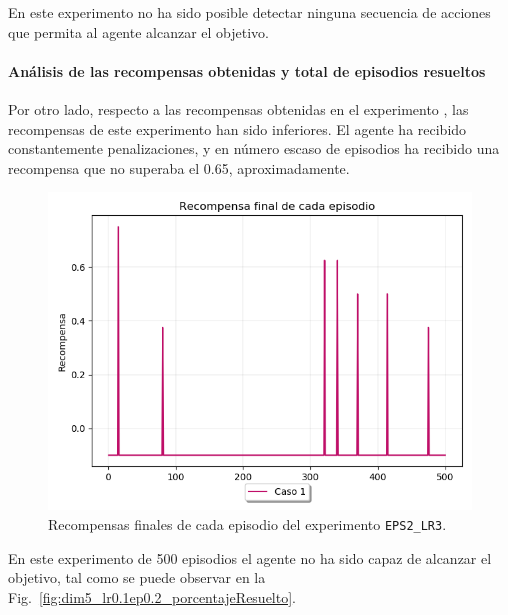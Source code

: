 En este experimento no ha sido posible detectar ninguna secuencia de acciones que permita al agente alcanzar el objetivo. 

\paragraph{Análisis de las recompensas obtenidas y total de episodios resueltos} 

Por otro lado, respecto a las recompensas obtenidas en el experimento , las recompensas de este experimento han sido inferiores. El agente ha recibido constantemente penalizaciones, y en número escaso de episodios ha recibido una recompensa que no superaba el 0.65, aproximadamente.\\

\begin{figure}
    \centering
    \includegraphics[scale=0.4]{cap5_experimentacion/images/dim5_lr0.1ep0.2_recompensa.png}
    \caption{Recompensas finales de cada episodio del experimento \texttt{EPS2\_LR3}.}
    \label{fig:dim5_lr0.1_ep0.2_recompensa}
\end{figure}

En este experimento de 500 episodios el agente no ha sido capaz de alcanzar el objetivo, tal como se puede observar en la Fig.~\ref{fig:dim5_lr0.1ep0.2_porcentajeResuelto}.

